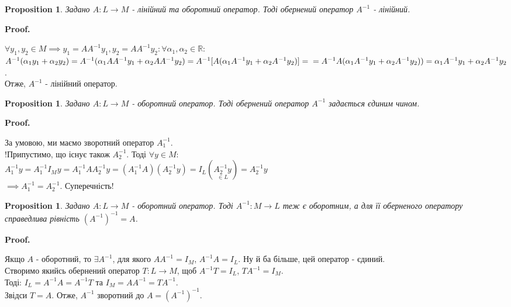 \documentclass[a4paper, 10pt]{article}
\makeatletter
\def\qed{$\blacksquare$}
\theoremstyle{theoremdd}
\theoremstyle{theoremdd}
\theoremstyle{theoremdd}
\theoremstyle{theoremdd}
\theoremstyle{theoremdd}
\newtheorem{proposition}[theorem]{Proposition}
\theoremstyle{theoremdd}
\theoremstyle{theoremdd}
\theoremstyle{theoremdd}
\renewenvironment{proof}[1][Proof.\\]{\par
\pushQED{\hfill \qed}%
\normalfont \topsep6\p@\@plus6\p@\relax
\trivlist
\item\relax
{\bfseries
#1\@addpunct{.}}\hspace\labelsep\ignorespaces
}{%
\popQED\endtrivlist\@endpefalse
}
\makeatother
\begin{document}
	\begin{proposition}
	Задано $A: L \to M$ - лінійний та оборотний оператор. Тоді обернений оператор $A^{-1}$ - лінійний.
	\end{proposition}
	
	\begin{proof}
	$\forall y_1, y_2 \in M \implies y_1 = AA^{-1}y_1, y_2 = AA^{-1}y_2: \forall \alpha_1, \alpha_2 \in \mathbb{R}:$\\
	$A^{-1}(\alpha_1 y_1 + \alpha_2 y_2) = A^{-1}(\alpha_1 AA^{-1}y_1 + \alpha_2 AA^{-1}y_2) = A^{-1}[A(\alpha_1 A^{-1}y_1 + \alpha_2 A^{-1}y_2)] = \\ = A^{-1}A(\alpha_1 A^{-1}y_1 + \alpha_2 A^{-1}y_2)) = \alpha_1 A^{-1}y_1 + \alpha_2 A^{-1}y_2$.\\
	Отже, $A^{-1}$ - лінійний оператор.
	\end{proof}
	
	\begin{proposition}
	Задано $A: L \to M$ - оборотний оператор. Тоді обернений оператор $A^{-1}$ задається єдиним чином.
	\end{proposition}
	
	\begin{proof}
	За умовою, ми маємо зворотний оператор $A_1^{-1}$.\\
	!Припустимо, що існує також $A^{-1}_2$. Тоді $\forall y \in M:$\\
	$A^{-1}_1 y = A^{-1}_1 I_M y = A^{-1}_1 A A^{-1}_2 y = (A^{-1}_1 A) (A^{-1}_2 y) = I_L (\underset{\in L}{A^{-1}_2 y}) = A_2^{-1}y$\\
	$\implies A^{-1}_1 = A^{-1}_2$. Суперечність!
	\end{proof}
	
	\begin{proposition}
	Задано $A: L \to M$ - оборотний оператор. Тоді $A^{-1}: M \to L$ теж є оборотним, а для її оберненого оператору справедлива рівність $(A^{-1})^{-1} = A$.
	\end{proposition}
	
	\begin{proof}
	Якщо $A$ - оборотний, то $\exists A^{-1}$, для якого $AA^{-1} = I_M$, $A^{-1}A = I_L$. Ну й ба більше, цей оператор - єдиний.\\
	Створимо якийсь обернений оператор $T: L \to M$, щоб $A^{-1}T = I_L$, $TA^{-1} = I_M$.\\
	Тоді: $I_L = A^{-1}A = A^{-1}T$ та $I_M = AA^{-1} = TA^{-1}$.\\
	Звідси $T = A$. Отже, $A^{-1}$ зворотний до $A = (A^{-1})^{-1}$.
	\end{proof}
	
\end{document}
